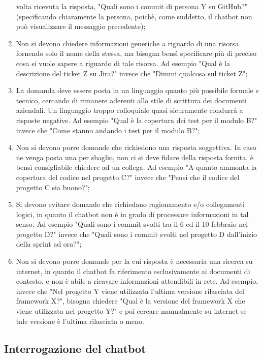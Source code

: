 \begin{enumerate}
    volta ricevuta la risposta, "Quali sono i commit di persona Y su GitHub?" (specificando chiaramente la persona, poichè, come suddetto, il chatbot non può visualizzare il messaggio precedente);
    \item Non si devono chiedere informazioni generiche a riguardo di una risorsa fornendo solo il nome della stessa, ma bisogna
    bensì specificare più di preciso cosa si vuole sapere a riguardo di tale risorsa. Ad esempio "Qual è la descrizione del ticket
    Z su Jira?" invece che "Dimmi qualcosa sul ticket Z";
    \item La domanda deve essere posta in un linguaggio quanto più possibile formale e tecnico, cercando di rimanere aderenti
    allo stile di scrittura dei documenti aziendali. Un linguaggio troppo colloquiale quasi sicuramente condurrà a risposte negative.
    Ad esempio "Qual è la copertura dei test per il modulo B?" invece che "Come stanno andando i test per il modulo B?";
    \item Non si devono porre domande che richiedono una risposta soggettiva. In caso ne venga posta una per sbaglio, non ci si deve
    fidare della risposta fornita, è bensì consigliabile chiedere ad un collega. Ad esempio "A quanto ammonta la copertura del codice
    nel progetto C?" invece che "Pensi che il codice del progetto C sia buono?";
    \item Si devono evitare domande che richiedano ragionamento e/o collegamenti logici, in quanto il chatbot non è in grado di
    processare informazioni in tal senso. Ad esempio "Quali sono i commit svolti tra il 6 ed il 10 febbraio nel progetto D?" invece che "Quali sono i
    commit svolti nel progetto D dall'inizio della sprint ad ora?";
    \item Non si devono porre domande per la cui risposta è necessaria una ricerca su internet, in quanto il chatbot fa
    riferimento esclusivamente ai documenti di contesto, e non è abile a ricavare informazioni attendibili in rete. Ad esempio, invece che "Nel
    progetto Y viene utilizzata l'ultima versione rilasciata del framework X?", bisogna chiedere "Qual è la versione del framework X
    che viene utilizzata nel progetto Y?" e poi cercare manualmente su internet se tale versione è l'ultima rilasciata o meno.
\end{enumerate}

\newpage


\subsection{Interrogazione del chatbot}

